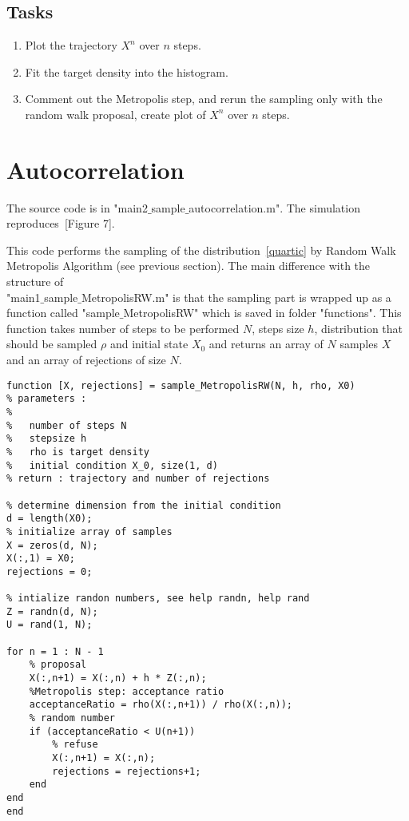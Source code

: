 \documentclass{scrartcl}
\begin{document}
\subsection{Tasks}
\begin{enumerate}
\item Plot the trajectory $X^n$ over $n $ steps.
\item Fit the target density into the histogram.
\item Comment out the Metropolis step, and rerun the sampling only with the random walk proposal, create plot of $X^n$ over $n $ steps. 
\end{enumerate}


\section{Autocorrelation}

The source code is in "main2$\_$sample$\_$autocorrelation.m". The simulation reproduces~\cite{sanz2014markov}[Figure 7].

This code performs the sampling of the distribution~\eqref{quartic} by Random Walk Metropolis Algorithm (see previous section). The main difference with the structure of \\ "main1$\_$sample$\_$MetropolisRW.m" is that the sampling part is wrapped up as a function called "sample$\_$MetropolisRW" which is saved in folder "functions". This function takes number of steps to be performed $N$, steps size $h$, distribution that should be sampled $\rho$ and initial state $X_0$ and returns an array of $N$ samples $X$ and an array of rejections of size $N$.
\begin{verbatim}
function [X, rejections] = sample_MetropolisRW(N, h, rho, X0)
% parameters :
%  
%   number of steps N
%   stepsize h
%   rho is target density
%   initial condition X_0, size(1, d)
% return : trajectory and number of rejections

% determine dimension from the initial condition
d = length(X0);
% initialize array of samples
X = zeros(d, N); 
X(:,1) = X0;
rejections = 0;

% intialize randon numbers, see help randn, help rand
Z = randn(d, N);
U = rand(1, N);

for n = 1 : N - 1   
    % proposal 
    X(:,n+1) = X(:,n) + h * Z(:,n);    
    %Metropolis step: acceptance ratio
    acceptanceRatio = rho(X(:,n+1)) / rho(X(:,n));    
    % random number    
    if (acceptanceRatio < U(n+1))
        % refuse
        X(:,n+1) = X(:,n);
        rejections = rejections+1;
    end
end
end
\end{verbatim}
\end{document}
